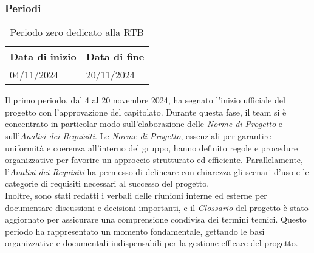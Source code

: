 \subsubsection{Periodi}
\label{sec:periodi}


\begin{table}[h!]
    \centering
    \renewcommand{\arraystretch}{1.5} %
    \begin{tabularx}{\textwidth}{|X|X|}\hline
    \rowcolor[HTML]{FFD700} 
    \textbf{Data di inizio} & \textbf{Data di fine} \\ \hline
    04/11/2024 & 20/11/2024 \\ \hline
    \end{tabularx}
    \caption{Periodo zero dedicato alla RTB}
\end{table}
Il primo periodo, dal 4 al 20 novembre 2024, ha segnato l’inizio ufficiale del progetto con l’approvazione del capitolato. Durante questa fase, il team si è concentrato in particolar modo sull’elaborazione delle \textit{Norme di Progetto} e sull'\textit{Analisi dei Requisiti}. Le \textit{Norme di Progetto}, essenziali per garantire uniformità e coerenza all’interno del gruppo, hanno definito regole e procedure organizzative per favorire un approccio strutturato ed efficiente. Parallelamente, l’\textit{Analisi dei Requisiti} ha permesso di delineare con chiarezza gli scenari d’uso e le categorie di requisiti necessari al successo del progetto.\\
Inoltre, sono stati redatti i verbali delle riunioni interne ed esterne per documentare discussioni e decisioni importanti, e il \textit{Glossario} del progetto è stato aggiornato per assicurare una comprensione condivisa dei termini tecnici. Questo periodo ha rappresentato un momento fondamentale, gettando le basi organizzative e documentali indispensabili per la gestione efficace del progetto.

